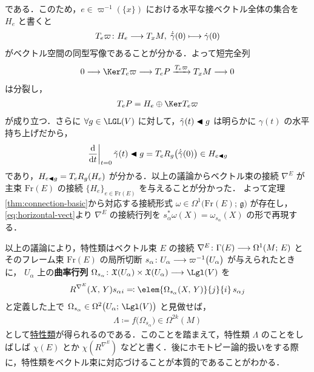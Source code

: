 \documentclass[TQFT_main]{subfiles}
\begin{document}
である．このため，$e \in \varpi^{-1}(\{x\})$ における水平な接ベクトル全体の集合を $H_e$ と書くと 
\begin{align}
    T_e \varpi \colon H_e \longrightarrow T_x M,\; \dot{\tilde{\gamma}}(0) \longmapsto \dot{\gamma}(0)
\end{align}
がベクトル空間の同型写像であることが分かる．よって短完全列
\begin{align}
    0 \lto \Ker T_e \varpi \lto T_e P \xrightarrow{T_e \varpi} T_x M \lto 0
\end{align}
は分裂し，
\begin{align}
    T_e P = H_e \oplus \Ker T_e \varpi
\end{align}
が成り立つ．さらに $\forall g \in \LGL(V)$ に対して，$\tilde{\gamma}(t) \blacktriangleleft g$ は明らかに $\gamma(t)$ の水平持ち上げだから，
\begin{align}
    \eval{\dv{}{t}}_{t=0}\tilde{\gamma}(t) \btl g = T_{e} R_g \bigl(\dot{\tilde{\gamma}}(0) \bigr) \in H_{e \btl g}
\end{align}
であり，$H_{e \blacktriangleleft g} = T_{e} R_g(H_e)$ が分かる．以上の議論からベクトル束の接続 $\nabla^E$ が主束 $\mathrm{Fr}(E)$ の接続 $\{H_e\}_{e \in \mathrm{Fr}(E)}$ を与えることが分かった．
よって定理\ref{thm:connection-basic}から対応する接続形式 $\omega \in \Omega^1 \bigl( \mathrm{Fr}(E);\, \mathfrak{g} \bigr)$ が存在し，\eqref{eq:horizontal-vect}より $\nabla^E$ の接続行列を $s_\alpha^* \omega(X) = \omega_{s_\alpha}(X)$ の形で再現する．

以上の議論により，特性類はベクトル束 $E$ の接続 $\nabla^E \colon \Gamma(E) \longrightarrow \Omega^1(M;\, E)$ とそのフレーム束 $\mathrm{Fr}(E)$ の局所切断 $s_\alpha \colon U_\alpha \longrightarrow \varpi^{-1} \bigl( U_\alpha \bigr)$ が与えられたときに，
$U_\alpha$ 上の\textbf{曲率行列} $\Omega_{s_\alpha} \colon \mathfrak{X}(U_\alpha) \times \mathfrak{X}(U_\alpha) \lto \Lgl(V)$ を
\begin{align}
    R^{\nabla^E}(X,\, Y)s_\alpha{}_i \eqqcolon \elem{\Omega_{s_\alpha}(X,\, Y)}{j}{i}\, s_\alpha{}_j
\end{align}
と定義した上で $\Omega_{s_\alpha} \in \Omega^2\bigl(U_\alpha;\, \Lgl(V)\bigr)$ と見做せば，
\begin{align}
    \Lambda \coloneqq f \bigl( \Omega_{s_\alpha} \bigr) \in \Omega^{2k}(M)
\end{align}
として\hyperref[def:characteristic-class-polynomial]{特性類}が得られるのである．このことを踏まえて，特性類 $\Lambda$ のことをしばしば $\chi(E)$ とか $\chi(R^{\nabla^E})$ などと書く．後にホモトピー論的扱いをする際に，特性類をベクトル束に対応づけることが本質的であることがわかる．
\end{document}
